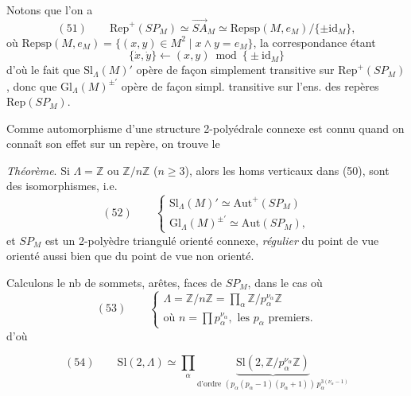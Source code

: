 \documentclass[11pt,a4paper]{article}
\begin{document}
Notons que l'on a
\[
(51)\qquad \mathrm{Rep}^{+}(SP_M) \simeq \overrightarrow{SA}_M \simeq \mathrm{Repsp}(M, e_M)/\{\pm \mathrm{id}_M\},
\]
où $\mathrm{Repsp}(M,e_M) = \{(x,y) \in M^2 \mid x \wedge y = e_M\}$, la correspondance étant
\[
\{\dot x, \dot y\} \longleftarrow (x,y) \bmod \{\pm \mathrm{id}_M\}
\]
d'où le fait que $\mathrm{Sl}_\Lambda(M)'$ opère de façon simplement transitive sur $\mathrm{Rep}^{+}(SP_M)$, donc que $\mathrm{Gl}_\Lambda(M)^{\pm\prime}$ opère de façon simpl. transitive sur l'ens. des repères $\mathrm{Rep}(SP_M)$.


     


Comme  automorphisme d'une structure 2-polyédrale connexe  est connu quand on connaît son effet sur un repère, on trouve le

\emph{Théorème}. Si $\Lambda = \mathbb{Z}$ ou $\mathbb{Z}/n\mathbb{Z}$ ($n \geq 3$), alors les homs verticaux dans (50), sont des isomorphismes, i.e.
\[
(52)\qquad
\begin{cases}
\mathrm{Sl}_\Lambda(M)' \simeq \mathrm{Aut}^{+}(SP_M) \\
\mathrm{Gl}_\Lambda(M)^{\pm\prime} \simeq \mathrm{Aut}(SP_M),
\end{cases}
\]
et $SP_M$ est un 2-polyèdre triangulé orienté connexe, \emph{régulier} du point de vue orienté aussi bien que du point de vue non orienté.

Calculons le nb de sommets, arêtes, faces de $SP_M$, dans le cas où
\[
(53)\qquad
\begin{cases}
\Lambda = \mathbb{Z}/n\mathbb{Z} = \prod_\alpha \mathbb{Z}/p_\alpha^{\nu_\alpha}\mathbb{Z} \\
\text{où } n = \prod p_\alpha^{\nu_\alpha}, \text{ les } p_\alpha \text{ premiers.}
\end{cases}
\]
d'où

\[
(54)\qquad \mathrm{Sl}(2,\Lambda) \simeq \prod_\alpha
\underbrace{\mathrm{Sl}(2, \mathbb{Z}/p_\alpha^{\nu_\alpha}\mathbb{Z})}_{\text{d'ordre } (p_\alpha(p_\alpha-1)(p_\alpha+1))\, p_\alpha^{3(\nu_\alpha-1)}}
\]
\end{document}
